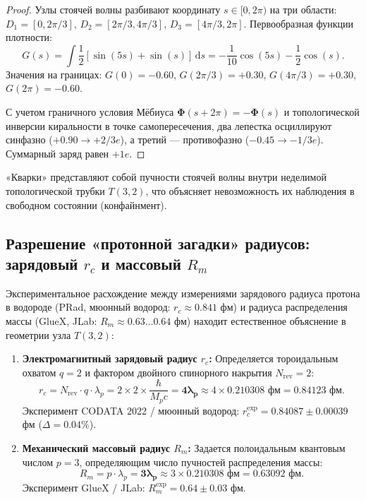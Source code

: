 \documentclass[11pt,a4paper]{article}
\theoremstyle{definition}
\theoremstyle{remark}
\begin{document}
\begin{proof}
Узлы стоячей волны разбивают координату $s \in [0, 2\pi)$ на три области: $D_1 = [0, 2\pi/3]$, $D_2 = [2\pi/3, 4\pi/3]$, $D_3 = [4\pi/3, 2\pi]$. Первообразная функции плотности:
\begin{equation}
    G(s) = \int \frac{1}{2}[\sin(5s) + \sin(s)] \, \mathrm{d}s = -\frac{1}{10}\cos(5s) - \frac{1}{2}\cos(s).
\end{equation}
Значения на границах: $G(0) = -0.60$, $G(2\pi/3) = +0.30$, $G(4\pi/3) = +0.30$, $G(2\pi) = -0.60$.

С учетом граничного условия Мёбиуса $\boldsymbol{\Phi}(s+2\pi) = -\boldsymbol{\Phi}(s)$ и топологической инверсии киральности в точке самопересечения, два лепестка осциллируют синфазно ($+0.90 \to +2/3e$), а третий --- противофазно ($-0.45 \to -1/3e$). Суммарный заряд равен $+1e$.
\end{proof}
«Кварки» представляют собой пучности стоячей волны внутри неделимой топологической трубки $T(3,2)$, что объясняет невозможность их наблюдения в свободном состоянии (конфайнмент).

\subsection{Разрешение «протонной загадки» радиусов: зарядовый $r_c$ и массовый $R_m$}
Экспериментальное расхождение между измерениями зарядового радиуса протона в водороде (PRad, мюонный водород: $r_c \approx 0.841$ фм) и радиуса распределения массы (GlueX, JLab: $R_m \approx 0.63\dots 0.64$ фм) находит естественное объяснение в геометрии узла $T(3,2)$:

\begin{enumerate}
    \item \textbf{Электромагнитный зарядовый радиус $r_c$:} Определяется тороидальным охватом $q=2$ и фактором двойного спинорного накрытия $N_{\mathrm{rev}} = 2$:
    \begin{equation}
        r_c = N_{\mathrm{rev}} \cdot q \cdot \lambda_p = 2 \times 2 \times \frac{\hbar}{M_p c} = \mathbf{4 \lambda_p} \approx 4 \times 0.210308\text{ фм} = \mathbf{0.84123\text{ фм}}.
        \label{eq:radius_charge}
    \end{equation}
    Эксперимент CODATA 2022 / мюонный водород: $r_c^{\mathrm{exp}} = 0.84087 \pm 0.00039$ фм ($\Delta = 0.04\%$).
    
    \item \textbf{Механический массовый радиус $R_m$:} Задается полоидальным квантовым числом $p=3$, определяющим число пучностей распределения массы:
    \begin{equation}
        R_m = p \cdot \lambda_p = \mathbf{3 \lambda_p} \approx 3 \times 0.210308\text{ фм} = \mathbf{0.63092\text{ фм}}.
        \label{eq:radius_mass}
    \end{equation}
    Эксперимент GlueX / JLab: $R_m^{\mathrm{exp}} = 0.64 \pm 0.03$ фм.
\end{enumerate}
\end{document}
